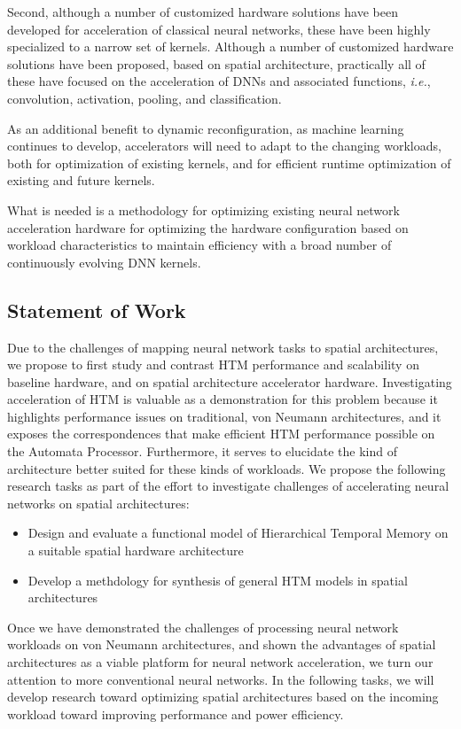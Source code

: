 Second, although a number of customized hardware solutions have been developed for acceleration of classical neural networks, these have been highly specialized to a narrow set of kernels.
Although a number of customized hardware solutions have been proposed, based on spatial architecture, practically all of these have focused on the acceleration of DNNs and associated functions, \textit{i.e.}, convolution, activation, pooling, and classification.

As an additional benefit to dynamic reconfiguration, as machine learning continues to develop, accelerators will need to adapt to the changing workloads, both for optimization of existing kernels, and for efficient runtime optimization of existing and future kernels.

What is needed is a methodology for optimizing existing neural network acceleration hardware for optimizing the hardware configuration based on workload characteristics to maintain efficiency with a broad number of continuously evolving DNN kernels.

\subsection{Statement of Work}

Due to the challenges of mapping neural network tasks to spatial architectures, we propose to first study and contrast HTM performance and scalability on baseline hardware, and on spatial architecture accelerator hardware.
Investigating acceleration of HTM is valuable as a demonstration for this problem because it highlights performance issues on traditional, von Neumann architectures, and it exposes the correspondences that make efficient HTM performance possible on the Automata Processor.
Furthermore, it serves to elucidate the kind of architecture better suited for these kinds of workloads.
We propose the following research tasks as part of the effort to investigate challenges of accelerating neural networks on spatial architectures:

\begin{itemize}
    \item Design and evaluate a functional model of Hierarchical Temporal Memory on a suitable spatial hardware architecture
    \item Develop a methdology for synthesis of general HTM models in spatial architectures
\end{itemize}

Once we have demonstrated the challenges of processing neural network workloads on von Neumann architectures, and shown the advantages of spatial architectures as a viable platform for neural network acceleration, we turn our attention to more conventional neural networks.
In the following tasks, we will develop research toward optimizing spatial architectures based on the incoming workload toward improving performance and power efficiency.

